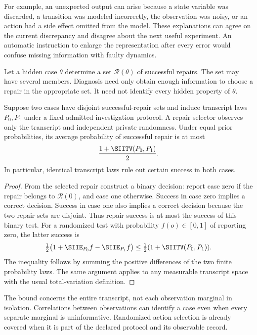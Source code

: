 For example, an unexpected output can arise because a state variable was discarded, a transition was modeled incorrectly, the observation was noisy, or an action had a side effect omitted from the model. These explanations can agree on the current discrepancy and disagree about the next useful experiment. An automatic instruction to enlarge the representation after every error would confuse missing information with faulty dynamics.

Let a hidden case $\theta$ determine a set $\mathcal R(\theta)$ of successful repairs. The set may have several members. Diagnosis need only obtain enough information to choose a repair in the appropriate set. It need not identify every hidden property of $\theta$.

\begin{SIIproposition}\label{SII:prop:indistinguishable}
Suppose two cases have disjoint successful-repair sets and induce transcript laws $P_0,P_1$ under a fixed admitted investigation protocol. A repair selector observes only the transcript and independent private randomness. Under equal prior probabilities, its average probability of successful repair is at most
\[
\frac{1+\SIITV(P_0,P_1)}2.
\]
In particular, identical transcript laws rule out certain success in both cases.
\end{SIIproposition}
\begin{proof}
From the selected repair construct a binary decision: report case zero if the repair belongs to $\mathcal R(0)$, and case one otherwise. Success in case zero implies a correct decision. Success in case one also implies a correct decision because the two repair sets are disjoint. Thus repair success is at most the success of this binary test. For a randomized test with probability $f(o)\in[0,1]$ of reporting zero, the latter success is
\[
\tfrac12\big(1+\SIIE_{P_0}f-\SIIE_{P_1}f\big)
\leq\tfrac12(1+\SIITV(P_0,P_1)).
\]
The inequality follows by summing the positive differences of the two finite probability laws. The same argument applies to any measurable transcript space with the usual total-variation definition.
\end{proof}

The bound concerns the entire transcript, not each observation marginal in isolation. Correlations between observations can identify a case even when every separate marginal is uninformative. Randomized action selection is already covered when it is part of the declared protocol and its observable record.

